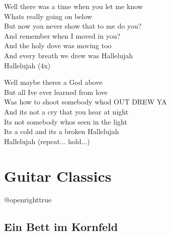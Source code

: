 \documentclass[
  letterpaper,
]{scrbook}
\begin{document}
Well there was a time when you let me know\\
What\textquotesingle s really going on below\\
But now you never show that to me do you?\\
And remember when I moved in you?\\
And the holy dove was moving too\\
And every breath we drew was Hallelujah\\
Hallelujah (4x)

Well maybe there\textquotesingle s a God above\\
But all I\textquotesingle ve ever learned from love\\
Was how to shoot somebody who\textquotesingle d OUT DREW YA\\
And it\textquotesingle s not a cry that you hear at night\\
It\textquotesingle s not somebody who\textquotesingle s seen in the
light\\
It\textquotesingle s a cold and it\textquotesingle s a broken
Hallelujah\\
Hallelujah (repeat... hold...)

\part{Guitar Classics}

\csname @openrighttrue\endcsname

\hypertarget{ein-bett-im-kornfeld}{%
\chapter{Ein Bett im Kornfeld}\label{ein-bett-im-kornfeld}}
\end{document}
